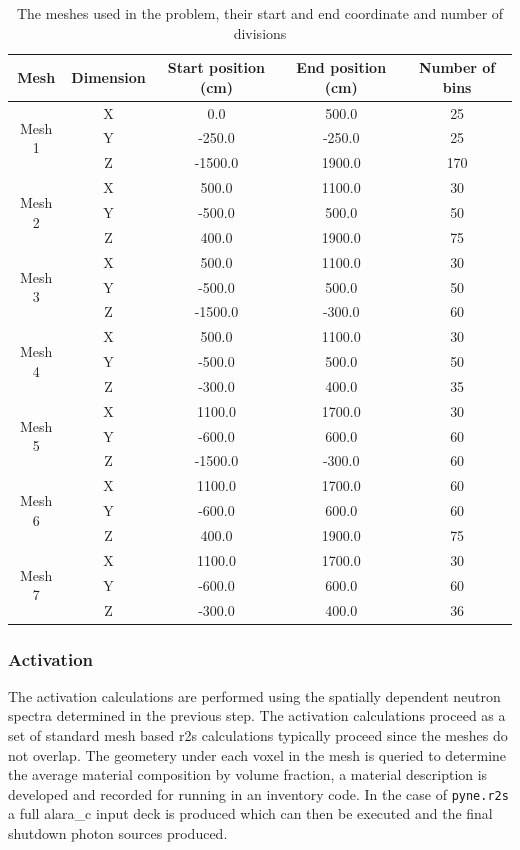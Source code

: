 \documentclass[12pt]{article}
\begin{document}
\begin{centering}
 \begin{table}[ht!]
  \begin{tabular}{c | c | c | c | c}
  \hline 
  Mesh & Dimension & Start position (cm) & End position (cm) & Number of bins\\
  \hline 
  \multirow{3}{*}{Mesh 1} & X & 0.0 & 500.0 & 25 \\ & Y & -250.0 & -250.0 & 25 \\
  & Z & -1500.0 & 1900.0 & 170 \\
  \hline
  \multirow{3}{*}{Mesh 2} & X & 500.0 & 1100.0 & 30 \\ & Y & -500.0 & 500.0 & 50\\
  & Z & 400.0 & 1900.0 & 75 \\
  \hline
  \multirow{3}{*}{Mesh 3} & X & 500.0 & 1100.0 & 30 \\ & Y & -500.0 & 500.0 & 50 \\
  & Z & -1500.0 & -300.0 & 60 \\
  \hline
  \multirow{3}{*}{Mesh 4} & X & 500.0 & 1100.0 & 30 \\ & Y & -500.0 & 500.0 & 50 \\
  & Z & -300.0 & 400.0 & 35 \\
  \hline
  \multirow{3}{*}{Mesh 5} & X & 1100.0 & 1700.0 & 30 \\ & Y & -600.0 & 600.0 & 60 \\
  & Z & -1500.0 & -300.0 & 60 \\
  \hline
  \multirow{3}{*}{Mesh 6} & X & 1100.0 & 1700.0 & 60 \\ & Y & -600.0 & 600.0 & 60 \\
  & Z & 400.0 & 1900.0 & 75\\
  \hline
  \multirow{3}{*}{Mesh 7} & X & 1100.0 & 1700.0 & 30 \\ & Y & -600.0 & 600.0 & 60 \\
  & Z & -300.0 & 400.0 & 36 
  \end{tabular}
 \caption{The meshes used in the problem, their start and end coordinate and
          number of divisions}
 \label{table:mesh_sizes}
 \end{table}
\end{centering}
\subsubsection{Activation}
The activation calculations are performed using the spatially dependent neutron
spectra determined in the previous step. The activation calculations proceed as
a set of standard mesh based \gls{r2s} calculations typically proceed since the 
meshes do not overlap. The geometery under each voxel in the mesh is queried to 
determine the average material composition by volume fraction, a material 
description is developed and recorded for running in an inventory code. In the 
case of \texttt{pyne.r2s} a full \gls{alara_c} input deck is produced which can
then be executed and the final shutdown photon sources produced. 
\end{document}
